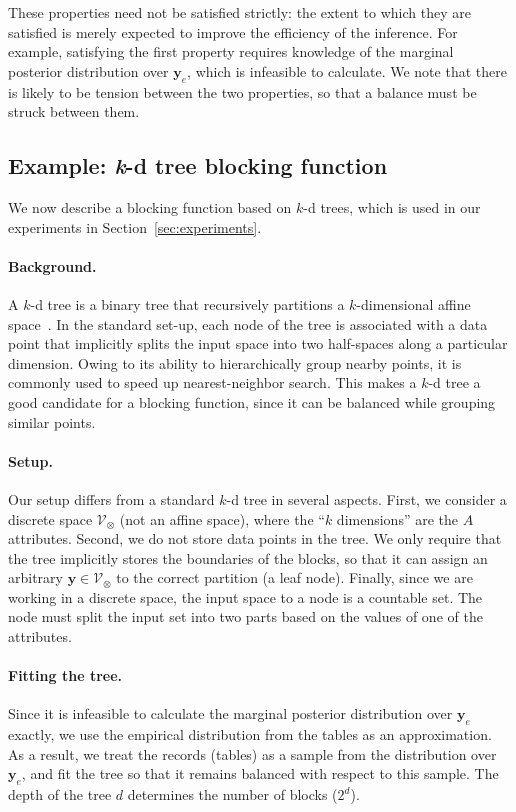 \documentclass[12pt,letterpaper]{article}
\renewcommand\vec{\bm}
\newcommand{\valset}{\mathcal{V}} %
\newcommand{\1}[1]{\mathbb{I}\!\left[#1\right]} %
\begin{document}
These properties need not be satisfied strictly: the extent to which 
they are satisfied is merely expected to improve the efficiency of 
the inference.
For example, satisfying the first property requires 
knowledge of the marginal posterior distribution 
over $\vec{y}_{e}$, which is infeasible to calculate.
We note that there is likely to be tension between the two properties, 
so that a balance must be struck between them.

\subsection{Example: \emph{k}-d tree blocking function}
\label{sec:kd}
We now describe a blocking function based on $k$-d trees, 
which is used in our experiments in Section~\ref{sec:experiments}.

\paragraph{Background.} A $k$-d tree is a binary tree that 
recursively partitions a $k$-dimensional affine 
space~\citep{bentley_multidimensional_1975, 
  friedman_algorithm_1977}.
In the standard set-up, each node of the tree is associated 
with a data point that implicitly splits the input space 
into two half-spaces along a particular dimension.
Owing to its ability to hierarchically group nearby 
points, it is commonly used to speed up nearest-neighbor 
search.
This makes a $k$-d tree a good candidate for a blocking function, 
since it can be balanced while grouping similar points.

\paragraph{Setup.} Our setup differs from a standard $k$-d tree in several 
aspects.
First, we consider a discrete space $\valset_\otimes$ (not an affine space), 
where the ``$k$ dimensions'' are the $A$ attributes. 
Second, we do not store data points in the tree. 
We only require that the tree implicitly stores the boundaries of the blocks, 
so that it can assign an arbitrary $\vec{y} \in \valset_\otimes$ to the 
correct partition (a leaf node).
Finally, since we are working in a discrete space, the input space to a node 
is a countable set. 
The node must split the input set into two parts based on the values of one 
of the attributes.

\paragraph{Fitting the tree.} Since it is infeasible to calculate the 
marginal posterior distribution over $\vec{y}_{e}$ exactly, we use the 
empirical distribution from the tables as an approximation.
As a result, we treat the records (tables) as a sample from the distribution 
over $\vec{y}_{e}$, and fit the tree so that it remains balanced with 
respect to this sample.
The depth of the tree $d$ determines the number of blocks ($2^d$).
\end{document}
